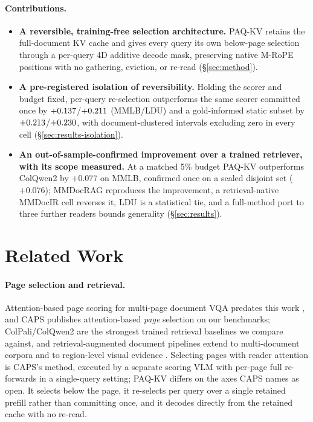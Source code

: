 \documentclass[letterpaper]{article} %
\newcommand{\paqc}{\textsc{PAQ-KV}}
\begin{document}
\paragraph{Contributions.}
\begin{itemize}
\item \textbf{A reversible, training-free selection architecture.} \paqc{}
retains the full-document KV cache and gives every query its own below-page
selection through a per-query 4D additive decode mask, preserving native
M-RoPE positions with no gathering, eviction, or re-read (\S\ref{sec:method}).
\item \textbf{A pre-registered isolation of reversibility.} Holding the
scorer and budget fixed, per-query re-selection outperforms the same scorer
committed once by $+0.137$/$+0.211$
(MMLB/LDU) and a gold-informed static subset by
$+0.213$/$+0.230$, with document-clustered
intervals excluding zero in every cell (\S\ref{sec:results-isolation}).
\item \textbf{An out-of-sample-confirmed improvement over a trained
retriever, with its scope measured.} At a matched 5\% budget \paqc{}
outperforms ColQwen2 by $+0.077$ on MMLB, confirmed once on a
sealed disjoint set ($+0.076$); MMDocRAG reproduces the improvement, a
retrieval-native MMDocIR cell reverses it, LDU is a statistical tie,
and a full-method port to three further readers bounds generality
(\S\ref{sec:results}).
\end{itemize}

\section{Related Work}\label{sec:related}

\paragraph{Page selection and retrieval.} Attention-based page scoring for
multi-page document VQA predates this work \citep{mpdocvqa2024}, and CAPS
\citep{zhu2026caps} publishes attention-based \emph{page} selection on our
benchmarks; ColPali/ColQwen2 \citep{faysse2025colpali} are the strongest
trained retrieval baselines we compare against, and retrieval-augmented
document pipelines extend to multi-document corpora \citep{cho2024m3docrag}
and to region-level visual evidence \citep{regionrag2025}. Selecting pages
with reader attention is CAPS's method, executed by a separate scoring VLM
with per-page full re-forwards in a single-query setting; \paqc{} differs on
the axes CAPS names as open. It selects below the page, it re-selects per
query over a single retained prefill rather than committing once, and it
decodes directly from the retained cache with no re-read.
\end{document}
